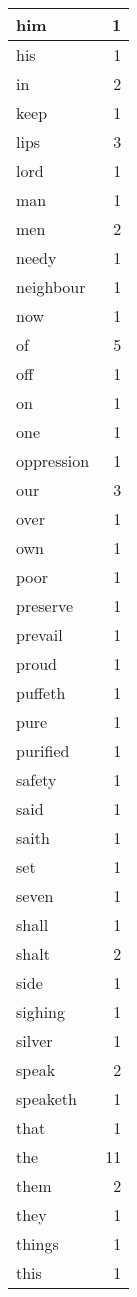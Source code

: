 \begin{center}
\begin{longtable}{l|r}
him & 1 \\ \hline
his & 1 \\ \hline
in & 2 \\ \hline
keep & 1 \\ \hline
lips & 3 \\ \hline
lord & 1 \\ \hline
man & 1 \\ \hline
men & 2 \\ \hline
needy & 1 \\ \hline
neighbour & 1 \\ \hline
now & 1 \\ \hline
of & 5 \\ \hline
off & 1 \\ \hline
on & 1 \\ \hline
one & 1 \\ \hline
oppression & 1 \\ \hline
our & 3 \\ \hline
over & 1 \\ \hline
own & 1 \\ \hline
poor & 1 \\ \hline
preserve & 1 \\ \hline
prevail & 1 \\ \hline
proud & 1 \\ \hline
puffeth & 1 \\ \hline
pure & 1 \\ \hline
purified & 1 \\ \hline
safety & 1 \\ \hline
said & 1 \\ \hline
saith & 1 \\ \hline
set & 1 \\ \hline
seven & 1 \\ \hline
shall & 1 \\ \hline
shalt & 2 \\ \hline
side & 1 \\ \hline
sighing & 1 \\ \hline
silver & 1 \\ \hline
speak & 2 \\ \hline
speaketh & 1 \\ \hline
that & 1 \\ \hline
the & 11 \\ \hline
them & 2 \\ \hline
they & 1 \\ \hline
things & 1 \\ \hline
this & 1 \\ \hline

\end{longtable}
\end{center}
